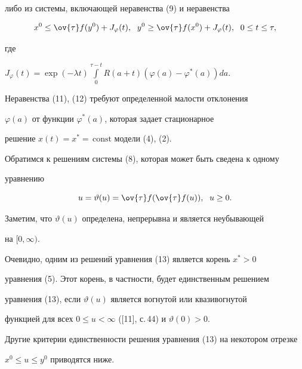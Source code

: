 либо из системы, включающей неравенства (9) и неравенства


\begin{equation}


x^{0} \leq \ov{\tau} f(y^{0})+J_{\varphi}(t),


\ \; y^{0} \geq \ov{\tau} f(x^{0})+J_{\varphi}(t),


\ \; 0 \leq t \leq \tau,


\end{equation}


где


$J_{\varphi}(t)=\exp(- \lambda t)


\int\limits_{0}^{\tau-t} R(a+t) (\varphi(a) - \varphi^{*}(a))da$.


Неравенства (11), (12) требуют определенной малости отклонения


$\varphi(a)$ от функции $\varphi^{*}(a)$, которая задает стационарное


решение $x(t)=x^{*}=\,\text{const}$ модели (4), (2).





Обратимся к решениям системы (8), которая может быть сведена к одному


уравнению


\begin{equation}


u=\vartheta(u)=\ov{\tau} f(\ov{\tau} f(u)), \ \; u \geq 0.


\end{equation}


Заметим, что $\vartheta(u)$ определена, непрерывна и является неубывающей


на $[0, \infty)$.


Очевидно, одним из решений уравнения (13) является корень $x^{*} > 0$


уравнения (5). Этот корень, в частности, будет единственным решением


уравнения (13), если $\vartheta(u)$ является вогнутой или квазивогнутой


функцией для всех $0 \leq u < \infty$ ([11], с.\,44) и $\vartheta(0) > 0$.


Другие критерии единственности решения уравнения (13) на некотором отрезке


$x^{0} \leq u \leq y^{0}$ приводятся ниже.





